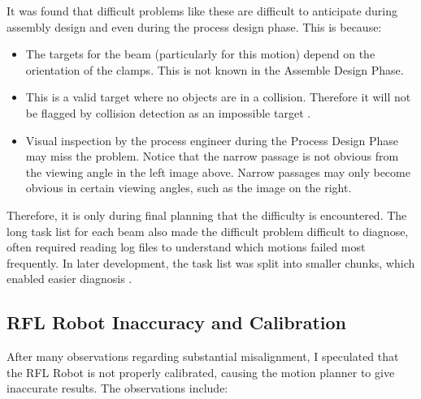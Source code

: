 It was found that difficult problems like these are difficult to anticipate during assembly design and even during the process design phase. This is because:

\begin{itemize}
	\item The targets for the beam (particularly for this motion) depend on the orientation of the clamps. This is not known in the Assemble Design Phase.

	\item This is a valid target where no objects are in a collision. Therefore it will not be flagged by collision detection as an impossible target .

	\item Visual inspection by the process engineer during the Process Design Phase may miss the problem. Notice that the narrow passage is not obvious from the viewing angle in the left image above. Narrow passages may only become obvious in certain viewing angles, such as the image on the right.

\end{itemize}
Therefore, it is only during final planning that the difficulty is encountered. The long task list for each beam also made the difficult problem difficult to diagnose, often required reading log files to understand which motions failed most frequently. In later development, the task list was split into smaller chunks, which enabled easier diagnosis .

\subsection{RFL Robot Inaccuracy and Calibration}
\label{subsection:exploration-3-rfl-robot-inaccuracy-and-calibration}

After many observations regarding substantial misalignment, I speculated that the RFL Robot is not properly calibrated, causing the motion planner to give inaccurate results. The observations include:

